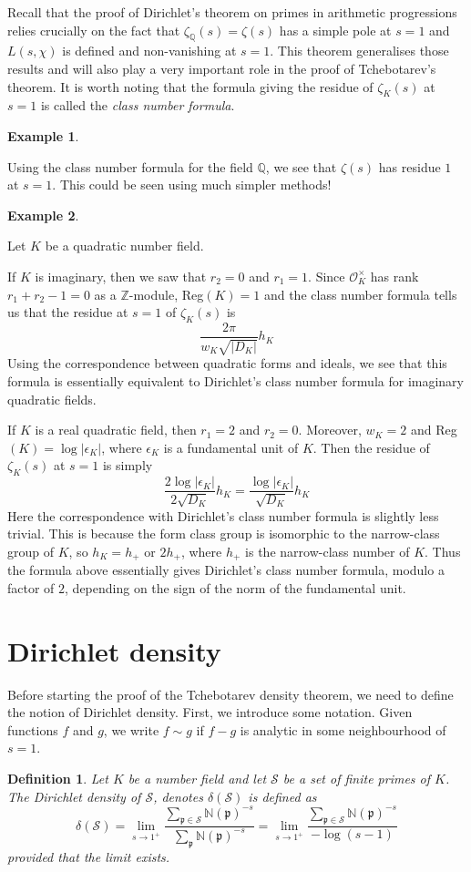 \documentclass[]{amsart}
\newtheorem{defn}{Definition}
\newtheorem{ex}{Example}
\newcommand{\Z}{\mathbb{Z}}
\newcommand{\Q}{\mathbb{Q}}
\renewcommand{\S}{\mathcal{S}}
\newcommand{\dS}{\delta(\mathcal{S})}
\newcommand{\OK}{\mathcal{O}_K}
\newcommand{\N}{\mathbb{N}}
\newcommand{\p}{\mathfrak{p}}
\begin{document}
		Recall that the proof of Dirichlet's theorem on primes in arithmetic progressions relies crucially on the fact that $\zeta_\Q(s)=\zeta(s)$ has a simple pole at $s=1$ and $L(s,\chi)$ is defined and non-vanishing at $s=1$. This theorem generalises those results and will also play a very important role in  the proof of Tchebotarev's theorem. It is worth noting that the formula giving the residue of $\zeta_K(s)$ at $s=1$ is called the \emph{class number formula}. 
	
		\begin{ex}\end{ex} Using the class number formula for the field $\Q$, we see that $\zeta(s)$ has residue $1$ at $s=1$. This could be seen using much simpler methods!
		
		\begin{ex}\end{ex} Let $K$ be a quadratic number field. 
		
		If $K$ is imaginary, then we saw that $r_2=0$ and $r_1=1$. Since $\OK^\times$ has rank $r_1+r_2-1=0$ as a $\Z$-module, Reg$(K)=1$ and the class number formula tells us that the residue at $s=1$ of $\zeta_K(s)$ is
		\[\frac{2\pi}{w_K\sqrt{|D_K|}}h_K\]
		Using the correspondence between quadratic forms and ideals, we see that this formula is essentially equivalent to Dirichlet's class number formula for imaginary quadratic fields.
		
		If $K$ is a real quadratic field, then $r_1=2$ and $r_2=0$. Moreover, $w_K=2$ and Reg$(K)=\log|\epsilon_K|$, where $\epsilon_K$ is a fundamental unit of $K$. Then the residue of $\zeta_K(s)$ at $s=1$ is simply
		\[\frac{2\log|\epsilon_K|}{2\sqrt{D_K}}h_K=\frac{\log|\epsilon_K|}{\sqrt{D_K}}h_K\]
		Here the correspondence with Dirichlet's class number formula is slightly less trivial. This is because the form class group is isomorphic to the narrow-class group of $K$, so $h_K=h_+$ or $2h_+$, where $h_+$ is the narrow-class number of $K$. Thus the formula above essentially gives Dirichlet's class number formula, modulo a factor of $2$, depending on the sign of the norm of the fundamental unit.
		
		\section{Dirichlet density}
			Before starting the proof of the Tchebotarev density theorem, we need to define the notion of Dirichlet density. First, we introduce some notation. Given functions $f$ and $g$, we write $f\sim g$ if $f-g$ is analytic in some neighbourhood of $s=1$. 
			\begin{defn}
				Let $K$ be a number field and let $\mathcal{S}$ be a set of finite primes of $K$. The Dirichlet density of $\S$, denotes $\delta(\S)$ is defined as
				\[\dS=\lim_{s\rightarrow 1^+}\frac{\sum_{\p\in\S}\N(\p)^{-s}}{\sum_{\p}\N(\p)^{-s}}=\lim_{s\rightarrow 1^+}\frac{\sum_{\p\in\S}\N(\p)^{-s}}{-\log(s-1)}\]
				provided that the limit exists.
			\end{defn}
			
\end{document}
